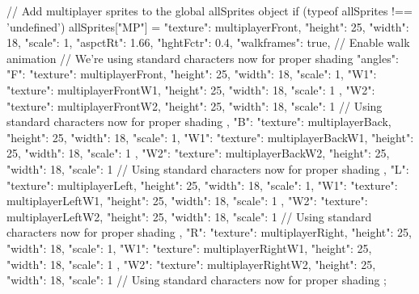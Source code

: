 // Add multiplayer sprites to the global allSprites object
if (typeof allSprites !== 'undefined') {
  allSprites["MP"] = {
    "texture": multiplayerFront,
    "height": 25,
    "width": 18,
    "scale": 1,
    "aspctRt": 1.66,
    "hghtFctr": 0.4,
    "walkframes": true, // Enable walk animation
    // We're using standard characters now for proper shading
    "angles": {
      "F": {
        "texture": multiplayerFront,
        "height": 25,
        "width": 18,
        "scale": 1,
        "W1": {
          "texture": multiplayerFrontW1,
          "height": 25,
          "width": 18,
          "scale": 1
        },
        "W2": {
          "texture": multiplayerFrontW2,
          "height": 25,
          "width": 18,
          "scale": 1
        }
        // Using standard characters now for proper shading
      },
      "B": {
        "texture": multiplayerBack,
        "height": 25,
        "width": 18,
        "scale": 1,
        "W1": {
          "texture": multiplayerBackW1,
          "height": 25,
          "width": 18,
          "scale": 1
        },
        "W2": {
          "texture": multiplayerBackW2,
          "height": 25,
          "width": 18,
          "scale": 1
        }
        // Using standard characters now for proper shading
      },
      "L": {
        "texture": multiplayerLeft,
        "height": 25,
        "width": 18,
        "scale": 1,
        "W1": {
          "texture": multiplayerLeftW1,
          "height": 25,
          "width": 18,
          "scale": 1
        },
        "W2": {
          "texture": multiplayerLeftW2,
          "height": 25,
          "width": 18,
          "scale": 1
        }
        // Using standard characters now for proper shading
      },
      "R": {
        "texture": multiplayerRight,
        "height": 25,
        "width": 18,
        "scale": 1,
        "W1": {
          "texture": multiplayerRightW1,
          "height": 25,
          "width": 18,
          "scale": 1
        },
        "W2": {
          "texture": multiplayerRightW2,
          "height": 25,
          "width": 18,
          "scale": 1
        }
        // Using standard characters now for proper shading
      }
    }
  };
}